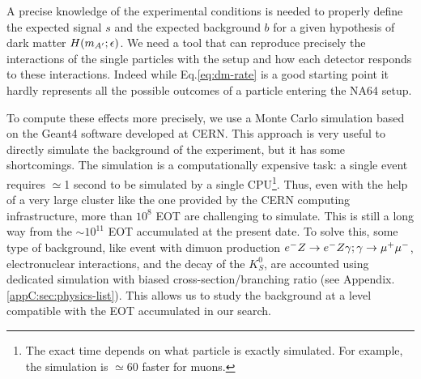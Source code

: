 A precise knowledge of the experimental conditions is needed to properly define the expected signal $s$ and the expected background $b$ for a given hypothesis of dark matter $H(m_{A'};\epsilon)$. We need a tool that can reproduce precisely the interactions of the single particles with the setup and how each detector responds to these interactions. Indeed while Eq.\ref{eq:dm-rate} is a good starting point it hardly represents all the possible outcomes of a particle entering the NA64 setup.

To compute these effects more precisely, we use a Monte Carlo simulation based on the Geant4 software \cite{AGOSTINELLI2003250,1610988} developed at CERN. This approach is very useful to directly simulate the background of the experiment, but it has some shortcomings. The simulation is a computationally expensive task: a single event requires $\simeq$1 second to be simulated by a single CPU\footnote{The exact time depends on what particle is exactly simulated. For example, the simulation is $\simeq$60 faster for muons.}. Thus, even with the help of a very large cluster like the one provided by the CERN computing infrastructure, more than $10^8$ EOT are challenging to simulate. This is still a long way from the $\sim 10^{11}$ EOT accumulated at the present date. To solve this, some type of background, like event with dimuon production $e^- Z \to e^- Z \gamma; \gamma \to \mu^+ \mu^-$, electronuclear interactions, and the decay of the $K^0_S$, are accounted using dedicated simulation with biased cross-section/branching ratio (see Appendix.\ref{appC:sec:physics-list}). This allows us to study the background at a level compatible with the EOT accumulated in our search.

